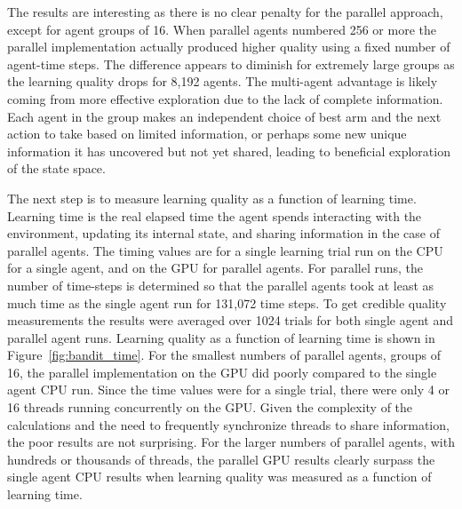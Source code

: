 \documentclass[11pt]{article} %
\begin{document}
\begin{flushleft}


The results are interesting as there is no clear penalty for the parallel approach, except for agent groups of 16.  When parallel agents numbered 256 or more the parallel implementation actually produced higher quality using a fixed number of agent-time steps.  The difference appears to diminish for extremely large groups as the learning quality drops for 8,192 agents.  The multi-agent advantage is likely coming from more effective exploration due to the lack of complete information.  Each agent in the group makes an independent choice of best arm and the next action to take based on limited information, or perhaps some new unique information it has uncovered but not yet shared, leading to beneficial exploration of the state space.

The next step is to measure learning quality as a function of learning time.  Learning time is the real elapsed time the agent spends interacting with the environment, updating its internal state, and sharing information in the case of parallel agents.  The timing values are for a single learning trial run on the CPU for a single agent, and on the GPU for parallel agents. For parallel runs, the number of time-steps is determined so that the parallel agents took at least as much time as the single agent run for 131,072 time steps.  To get credible quality measurements the results were averaged over 1024 trials for both single agent and parallel agent runs.  Learning quality as a function of learning time is shown in Figure~\ref{fig:bandit_time}.  For the smallest numbers of parallel agents, groups of 16, the parallel implementation on the GPU did poorly compared to the single agent CPU run.  Since the time values were for a single trial, there were only 4 or 16 threads running concurrently on the GPU.  Given the complexity of the calculations and the need to frequently synchronize threads to share information, the poor results are not surprising.  For the larger numbers of parallel agents, with hundreds or thousands of threads, the parallel GPU results clearly surpass the single agent CPU results when learning quality was measured as a function of learning time.


\end{flushleft}
\end{document}
